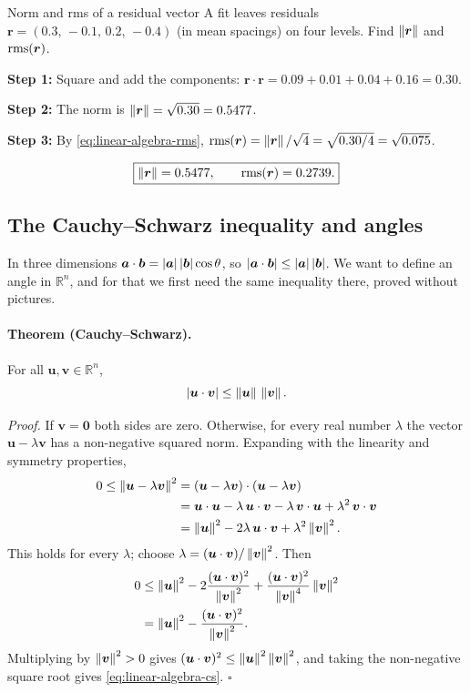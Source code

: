\begin{sample}{Norm and rms of a residual vector}
A fit leaves residuals $\bm r=(0.3,\,-0.1,\,0.2,\,-0.4)$ (in mean spacings) on four levels. Find $\left\lVert \bm r\right\rVert$ and $\mathrm{rms}(\bm r)$.

\textbf{Step 1:} Square and add the components: $\bm r\cdot\bm r=0.09+0.01+0.04+0.16=0.30$.

\textbf{Step 2:} The norm is $\left\lVert \bm r\right\rVert=\sqrt{0.30}=0.5477$.

\textbf{Step 3:} By \cref{eq:linear-algebra-rms}, $\mathrm{rms}(\bm r)=\left\lVert \bm r\right\rVert/\sqrt4=\sqrt{0.30/4}=\sqrt{0.075}$.

\[
\boxed{\left\lVert \bm r\right\rVert=0.5477,\qquad \mathrm{rms}(\bm r)=0.2739.}
\]
\end{sample}

\subsection{The Cauchy--Schwarz inequality and angles}

In three dimensions $\bm a\cdot\bm b=\left\lvert \bm a\right\rvert\left\lvert \bm b\right\rvert\cos\theta$, so $\left\lvert \bm a\cdot\bm b\right\rvert\le\left\lvert \bm a\right\rvert\left\lvert \bm b\right\rvert$. We want to define an angle in $\mathbb R^n$, and for that we first need the same inequality there, proved without pictures.

\paragraph{Theorem (Cauchy--Schwarz).} For all $\bm u,\bm v\in\mathbb R^n$,
\begin{equation}
\left\lvert \bm u\cdot\bm v\right\rvert\le\left\lVert \bm u\right\rVert\,\left\lVert \bm v\right\rVert.
\label{eq:linear-algebra-cs}
\end{equation}

\emph{Proof.} If $\bm v=\bm 0$ both sides are zero. Otherwise, for every real number $\lambda$ the vector $\bm u-\lambda\bm v$ has a non-negative squared norm. Expanding with the linearity and symmetry properties,
\begin{align*}
0\le\left\lVert \bm u-\lambda\bm v\right\rVert^2 &=(\bm u-\lambda\bm v)\cdot(\bm u-\lambda\bm v)\\
&=\bm u\cdot\bm u-\lambda\,\bm u\cdot\bm v-\lambda\,\bm v\cdot\bm u+\lambda^2\,\bm v\cdot\bm v\\
&=\left\lVert \bm u\right\rVert^2-2\lambda\,\bm u\cdot\bm v+\lambda^2\left\lVert \bm v\right\rVert^2 .
\end{align*}
This holds for every $\lambda$; choose $\lambda=(\bm u\cdot\bm v)/\left\lVert \bm v\right\rVert^2$. Then
\begin{align*}
0&\le\left\lVert \bm u\right\rVert^2-2\frac{(\bm u\cdot\bm v)^2}{\left\lVert \bm v\right\rVert^2}+\frac{(\bm u\cdot\bm v)^2}{\left\lVert \bm v\right\rVert^4}\left\lVert \bm v\right\rVert^2\\
&=\left\lVert \bm u\right\rVert^2-\frac{(\bm u\cdot\bm v)^2}{\left\lVert \bm v\right\rVert^2}.
\end{align*}
Multiplying by $\left\lVert \bm v\right\rVert^2>0$ gives $(\bm u\cdot\bm v)^2\le\left\lVert \bm u\right\rVert^2\left\lVert \bm v\right\rVert^2$, and taking the non-negative square root gives \cref{eq:linear-algebra-cs}. $\square$

